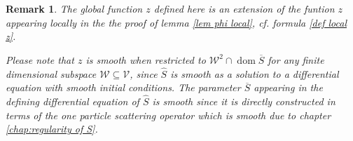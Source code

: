 \documentclass[b5paper,draft,openbib,12pt]{memoir}
\newtheorem{Remark}[Def]{Remark}
\DeclareMathOperator{\dom}{dom}
\begin{document}
\begin{Remark}
The global function \(z\) defined here is an extension 
of the funtion \(z\) appearing locally 
in the 
the proof of lemma \ref{lem phi local},
cf. formula \eqref{def local z}.

Please note that \(z\) is smooth
when restricted to  \(\mathcal{W}^2\cap \dom\overline{S}\) 
for any finite dimensional subspace
\(\mathcal{W}\subseteq \mathcal{V}\), since 
\(\hat{S}\) is smooth as a solution to a differential 
equation with smooth initial conditions. 
The parameter \(\overline{S}\) appearing in the defining 
differential equation of \(\hat{S}\) is smooth 
since it is directly constructed in terms of 
the one particle scattering operator which is smooth 
due to chapter \ref{chap:regularity of S}.
\end{Remark}
\end{document}
